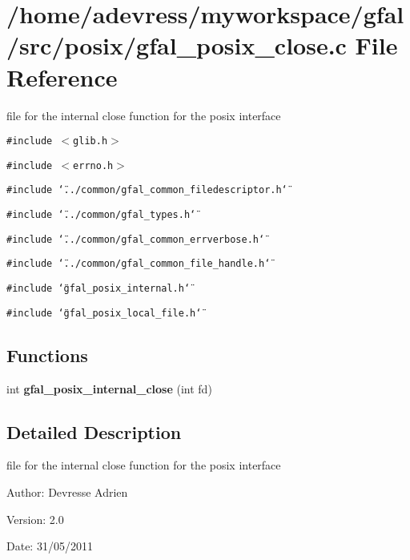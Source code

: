 \section{/home/adevress/myworkspace/gfal/src/posix/gfal\_\-posix\_\-close.c File Reference}
\label{gfal__posix__close_8c}
file for the internal close function for the posix interface 

{\tt \#include $<$glib.h$>$}\par
{\tt \#include $<$errno.h$>$}\par
{\tt \#include \char`\"{}../common/gfal\_\-common\_\-filedescriptor.h\char`\"{}}\par
{\tt \#include \char`\"{}../common/gfal\_\-types.h\char`\"{}}\par
{\tt \#include \char`\"{}../common/gfal\_\-common\_\-errverbose.h\char`\"{}}\par
{\tt \#include \char`\"{}../common/gfal\_\-common\_\-file\_\-handle.h\char`\"{}}\par
{\tt \#include \char`\"{}gfal\_\-posix\_\-internal.h\char`\"{}}\par
{\tt \#include \char`\"{}gfal\_\-posix\_\-local\_\-file.h\char`\"{}}\par
\subsection*{Functions}
\begin{CompactItemize}
\item 
int \textbf{gfal\_\-posix\_\-internal\_\-close} (int fd)\label{gfal__posix__close_8c_9cfa5dfe3dff862999ce8f5c5b62a0c4}

\end{CompactItemize}


\subsection{Detailed Description}
file for the internal close function for the posix interface 

\begin{Desc}
\item[Author:]Devresse Adrien \end{Desc}
\begin{Desc}
\item[Version:]2.0 \end{Desc}
\begin{Desc}
\item[Date:]31/05/2011 \end{Desc}

